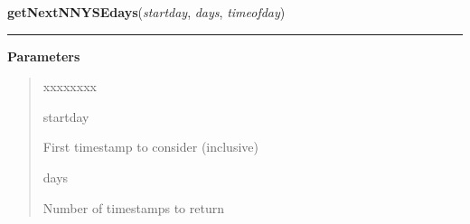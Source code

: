     \label{trunk:qstkutil:dateutil:getNextNNYSEdays}

    \vspace{0.5ex}

\hspace{.8\funcindent}\begin{boxedminipage}{\funcwidth}

    \raggedright \textbf{getNextNNYSEdays}(\textit{startday}, \textit{days}, \textit{timeofday})

    \vspace{-1.5ex}

    \rule{\textwidth}{0.5\fboxrule}
\setlength{\parskip}{2ex}
\setlength{\parskip}{1ex}
      \textbf{Parameters}
      \vspace{-1ex}

      \begin{quote}
        \begin{Ventry}{xxxxxxxx}

          \item[startday]

          First timestamp to consider (inclusive)

          \item[days]

          Number of timestamps to return

        \end{Ventry}

      \end{quote}

    \end{boxedminipage}

    \label{trunk:qstkutil:dateutil:ymd2epoch}

    \vspace{0.5ex}

